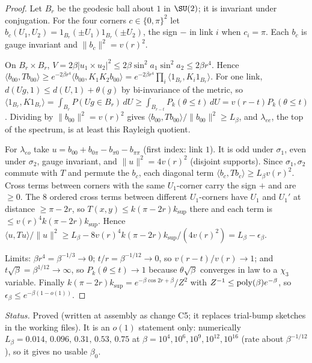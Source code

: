 \begin{proof}
Let $B_r$ be the geodesic ball about $1$ in $\SU(2)$; it is invariant under conjugation. For the four
corners $c\in\{0,\pi\}^2$ let $b_c(U_1,U_2)=1_{B_r}(\pm U_1)1_{B_r}(\pm U_2)$, the sign $-$ in link
$i$ when $c_i=\pi$. Each $b_c$ is gauge invariant and $\|b_c\|^2=v(r)^2$.

On $B_r\times B_r$, $V=2\beta|u_1\times u_2|^2\le2\beta\sin^2a_1\sin^2a_2\le2\beta r^4$. Hence
$\langle b_{00},Tb_{00}\rangle\ge e^{-2\beta r^4}\langle b_{00},K_1K_2b_{00}\rangle
=e^{-2\beta r^4}\prod_i\langle1_{B_r},K_i1_{B_r}\rangle$. For one link, $d(Ug,1)\le d(U,1)+\theta(g)$
by bi-invariance of the metric, so
$\langle1_{B_r},K1_{B_r}\rangle=\int_{B_r}P(Ug\in B_r)\,dU\ge\int_{B_{r-t}}P_k(\theta\le t)\,dU=v(r-t)P_k(\theta\le t)$.
Dividing by $\|b_{00}\|^2=v(r)^2$ gives $\langle b_{00},Tb_{00}\rangle/\|b_{00}\|^2\ge L_\beta$, and
$\lambda_{ee}$, the top of the spectrum, is at least this Rayleigh quotient.

For $\lambda_{eo}$ take $u=b_{00}+b_{0\pi}-b_{\pi0}-b_{\pi\pi}$ (first index: link $1$). It is odd under
$\sigma_1$, even under $\sigma_2$, gauge invariant, and $\|u\|^2=4v(r)^2$ (disjoint supports). Since
$\sigma_1,\sigma_2$ commute with $T$ and permute the $b_c$, each diagonal term
$\langle b_c,Tb_c\rangle\ge L_\beta v(r)^2$. Cross terms between corners with the same $U_1$-corner
carry the sign $+$ and are $\ge0$. The $8$ ordered cross terms between different $U_1$-corners have
$U_1$ and $U_1'$ at distance $\ge\pi-2r$, so $T(x,y)\le k(\pi-2r)k_{\sup}$ there and each term is
$\le v(r)^4k(\pi-2r)k_{\sup}$. Hence
$\langle u,Tu\rangle/\|u\|^2\ge L_\beta-8v(r)^4k(\pi-2r)k_{\sup}/(4v(r)^2)=L_\beta-\epsilon_\beta$.

Limits: $\beta r^4=\beta^{-1/3}\to0$; $t/r=\beta^{-1/12}\to0$, so $v(r-t)/v(r)\to1$; and
$t\sqrt\beta=\beta^{1/12}\to\infty$, so $P_k(\theta\le t)\to1$ because $\theta\sqrt\beta$ converges in
law to a $\chi_3$ variable. Finally $k(\pi-2r)k_{\sup}=e^{-\beta\cos2r+\beta}/Z^2$ with
$Z^{-1}\le{\rm poly}(\beta)e^{-\beta}$, so $\epsilon_\beta\le e^{-\beta(1-o(1))}$.
\end{proof}

\noindent\emph{Status.} Proved (written at assembly as change C5; it replaces trial-bump sketches in
the working files). It is an $o(1)$ statement only: numerically $L_\beta=0.014,\,0.096,\,0.31,\,0.53,\,0.75$
at $\beta=10^4,10^6,10^9,10^{12},10^{16}$ (rate about $\beta^{-1/12}$), so it gives no usable $\beta_0$.

